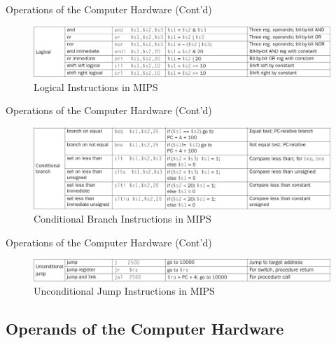 \begin{frame}{Operations of the Computer Hardware (Cont'd)}
\begin{figure}\caption{Logical Instructions in MIPS}
\begin{center}
\includegraphics[width=\textwidth, height=0.4\textheight]{docs/images/operations-3}
\end{center}
\end{figure}
\end{frame}

\begin{frame}{Operations of the Computer Hardware (Cont'd)}
\begin{figure}\caption{Conditional Branch Instructions in MIPS}
\begin{center}
\includegraphics[width=\textwidth, height=0.5\textheight]{docs/images/operations-4}
\end{center}
\end{figure}
\end{frame}

\begin{frame}{Operations of the Computer Hardware (Cont'd)}
\begin{figure}\caption{Unconditional Jump Instructions in MIPS}
\begin{center}
\includegraphics[width=\textwidth, height=0.17\textheight]{docs/images/operations-5  }
\end{center}
\end{figure}
\end{frame}

\subsection{Operands of the Computer Hardware}
